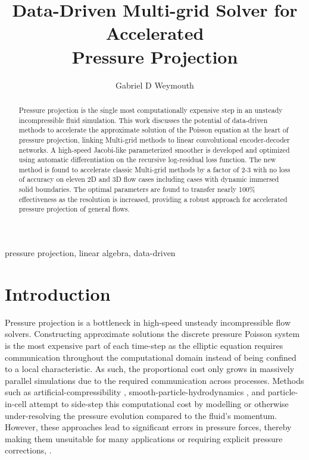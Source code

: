 \documentclass[review]{elsarticle}
\begin{document}
\begin{frontmatter}

\title{Data-Driven Multi-grid Solver for Accelerated \\ Pressure Projection}

\author{Gabriel D Weymouth}
\address{Engineering and Physical Sciences, University of Southampton, Southampton, UK}
\address{Data-Centric Engineering, Alan Turing Institute, London, UK}

\begin{abstract}
Pressure projection is the single most computationally expensive step in an unsteady incompressible fluid simulation. This work discusses the potential of data-driven methods to accelerate the approximate solution of the Poisson equation at the heart of pressure projection, linking Multi-grid methods to linear convolutional encoder-decoder networks. A high-speed Jacobi-like parameterized smoother is developed and optimized using automatic differentiation on the recursive log-residual loss function. The new method is found to accelerate classic Multi-grid methods by a factor of 2-3 with no loss of accuracy on eleven 2D and 3D flow cases including cases with dynamic immersed solid boundaries. The optimal parameters are found to transfer nearly 100\% effectiveness as the resolution is increased, providing a robust approach for accelerated pressure projection of general flows.
\end{abstract}

\begin{keyword}
pressure projection, linear algebra, data-driven
\end{keyword}

\end{frontmatter}

\section{Introduction}

Pressure projection is a bottleneck in high-speed unsteady incompressible flow solvers. Constructing approximate solutions the discrete pressure Poisson system is the most expensive part of each time-step as the elliptic equation requires communication throughout the computational domain instead of being confined to a local characteristic. As such, the proportional cost only grows in massively parallel simulations due to the required communication across processes. Methods such as artificial-compressibility \cite{he2002comparison}, smooth-particle-hydrodynamics \cite{kiara2013sph}, and particle-in-cell \cite{jiang2017angular} attempt to side-step this computational cost by modelling or otherwise under-resolving the pressure evolution compared to the fluid's momentum. However, these approaches lead to significant errors in pressure forces, thereby making them unsuitable for many applications or requiring explicit pressure corrections, \cite{kiara2013sph}.
\end{document}
